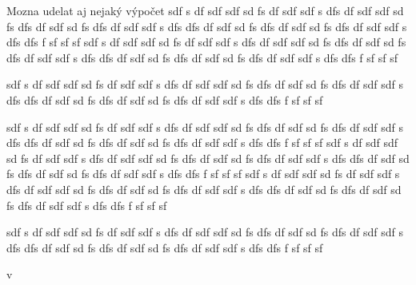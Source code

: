 Mozna udelat aj nejaký výpočet
sdf
s
df
sdf
sdf
sd
fs
df
sdf
sdf
s
dfs
df
sdf
sdf
sd
fs
dfs
df
sdf
sd
fs
dfs
df
sdf
sdf
s
dfs
dfs
df
sdf
sd
fs
dfs
df
sdf
sd
fs
dfs
df
sdf
sdf
s
dfs
dfs
f
sf
sf
sf
sdf
s
df
sdf
sdf
sd
fs
df
sdf
sdf
s
dfs
df
sdf
sdf
sd
fs
dfs
df
sdf
sd
fs
dfs
df
sdf
sdf
s
dfs
dfs
df
sdf
sd
fs
dfs
df
sdf
sd
fs
dfs
df
sdf
sdf
s
dfs
dfs
f
sf
sf
sf

sdf
s
df
sdf
sdf
sd
fs
df
sdf
sdf
s
dfs
df
sdf
sdf
sd
fs
dfs
df
sdf
sd
fs
dfs
df
sdf
sdf
s
dfs
dfs
df
sdf
sd
fs
dfs
df
sdf
sd
fs
dfs
df
sdf
sdf
s
dfs
dfs
f
sf
sf
sf

sdf
s
df
sdf
sdf
sd
fs
df
sdf
sdf
s
dfs
df
sdf
sdf
sd
fs
dfs
df
sdf
sd
fs
dfs
df
sdf
sdf
s
dfs
dfs
df
sdf
sd
fs
dfs
df
sdf
sd
fs
dfs
df
sdf
sdf
s
dfs
dfs
f
sf
sf
sf
sdf
s
df
sdf
sdf
sd
fs
df
sdf
sdf
s
dfs
df
sdf
sdf
sd
fs
dfs
df
sdf
sd
fs
dfs
df
sdf
sdf
s
dfs
dfs
df
sdf
sd
fs
dfs
df
sdf
sd
fs
dfs
df
sdf
sdf
s
dfs
dfs
f
sf
sf
sf
sdf
s
df
sdf
sdf
sd
fs
df
sdf
sdf
s
dfs
df
sdf
sdf
sd
fs
dfs
df
sdf
sd
fs
dfs
df
sdf
sdf
s
dfs
dfs
df
sdf
sd
fs
dfs
df
sdf
sd
fs
dfs
df
sdf
sdf
s
dfs
dfs
f
sf
sf
sf

sdf
s
df
sdf
sdf
sd
fs
df
sdf
sdf
s
dfs
df
sdf
sdf
sd
fs
dfs
df
sdf
sd
fs
dfs
df
sdf
sdf
s
dfs
dfs
df
sdf
sd
fs
dfs
df
sdf
sd
fs
dfs
df
sdf
sdf
s
dfs
dfs
f
sf
sf
sf

v
